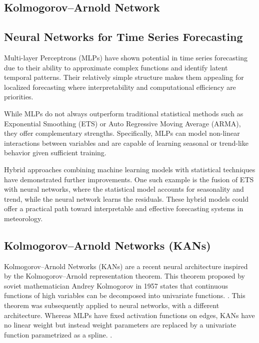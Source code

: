 \subsection{Kolmogorov–Arnold Network}

\subsection{Neural Networks for Time Series Forecasting}

Multi-layer Perceptrons (MLPs) have shown potential in time series forecasting due to their ability to approximate complex functions and identify latent temporal patterns.\cite{chen2023tsmixerallmlparchitecturetime} Their relatively simple structure makes them appealing for localized forecasting where interpretability and computational efficiency are priorities.

While MLPs do not always outperform traditional statistical methods such as Exponential Smoothing (ETS) or Auto Regressive Moving Average (ARMA), they offer complementary strengths.\cite{hewamalage2021recurrent} Specifically, MLPs can model non-linear interactions between variables and are capable of learning seasonal or trend-like behavior given sufficient training.

Hybrid approaches combining machine learning models with statistical techniques have demonstrated further improvements. One such example is the fusion of ETS with neural networks, where the statistical model accounts for seasonality and trend, while the neural network learns the residuals.\cite{panigrahi2017hybrid} These hybrid models could offer a practical path toward interpretable and effective forecasting systems in meteorology.


\subsection{Kolmogorov–Arnold Networks (KANs)}

Kolmogorov–Arnold Networks (KANs) are a recent neural architecture inspired by the Kolmogorov–Arnold representation theorem.
This theorem proposed by soviet mathematician Andrey Kolmogorov in 1957 states that continuous functions of high variables can be decomposed into univariate functions. \cite{kolmogorov1961representation}. 
This theorem was subsequently applied to neural networks, with a different architecture. Whereas MLPs have fixed activation functions on edges, KANs have no linear weight but instead weight parameters are replaced by a univariate function parametrized as a spline. \cite{somvanshi2024survey}. 

